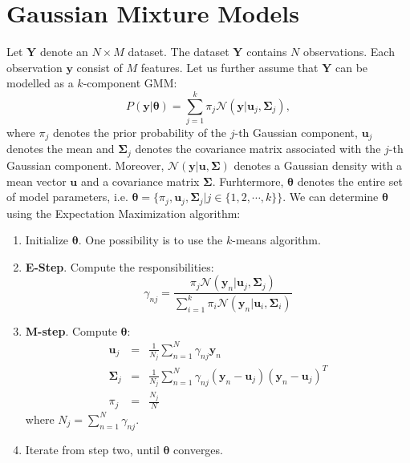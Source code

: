 \documentclass{article}
\begin{document}
\section{Gaussian Mixture Models}
\label{sec:GMM}
Let $\mathbf{Y}$ denote an $N\times M$ dataset. The dataset $\mathbf{Y}$ contains $N$ observations. Each observation $\mathbf{y}$ consist of $M$ features. Let us further assume 
that $\mathbf{Y}$ can be modelled as a $k$-component GMM:
\begin{equation}
P(\mathbf{y}|\boldsymbol{\theta})=\sum_{j=1}^k \pi_j \mathcal{N}(\mathbf{y}|\mathbf{u}_j,\mathbf{\Sigma}_j),
\end{equation}
where $\pi_j$ denotes the prior probability of the $j$-th Gaussian component, $\mathbf{u}_j$ denotes the mean and $\mathbf{\Sigma}_j$ denotes the covariance matrix associated with the $j$-th Gaussian component. Moreover,
$\mathcal{N}(\mathbf{y}|\mathbf{u},\mathbf{\Sigma})$ denotes a Gaussian density with a mean vector $\mathbf{u}$ and a covariance matrix $\mathbf{\Sigma}$. Furhtermore, $\boldsymbol{\theta}$ denotes the entire set of model parameters, i.e. $\boldsymbol{\theta}=\{\pi_j,\mathbf{u}_j,\mathbf{\Sigma}_j|j\in\{1,2,\cdots,k\}\}$.
We can determine $\boldsymbol{\theta}$ using the Expectation Maximization algorithm:
\begin{enumerate}
 \item Initialize $\boldsymbol{\theta}$. One possibility is to use the $k$-means algorithm.
 \item \textbf{E-Step}. Compute the responsibilities:
 \begin{equation}
  \gamma_{nj} = \frac{\pi_j\mathcal{N}(\mathbf{y}_n|\mathbf{u}_j,\mathbf{\Sigma}_j)}{\sum_{i=1}^{k}\pi_i\mathcal{N}(\mathbf{y}_n|\mathbf{u}_i,\mathbf{\Sigma}_i)}
 \end{equation}
 \item \textbf{M-step}. Compute $\boldsymbol{\theta}$:
 \begin{eqnarray}
  \mathbf{u}_j &=& \frac{1}{N_j} \sum_{n=1}^{N} \gamma_{nj}\mathbf{y}_n\\
  \mathbf{\Sigma}_j &=& \frac{1}{N_j} \sum_{n=1}^{N} \gamma_{nj} (\mathbf{y}_n-\mathbf{u}_j)(\mathbf{y}_n-\mathbf{u}_j)^T\\
  \pi_j &=& \frac{N_j}{N}
 \end{eqnarray}
 where $N_j = \sum_{n=1}^N \gamma_{nj}$.
 \item Iterate from step two, until $\boldsymbol{\theta}$ converges.
\end{enumerate}
\end{document}
